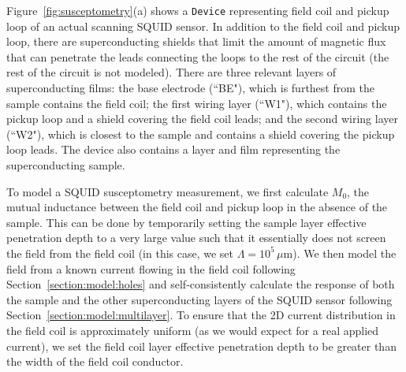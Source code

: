 \documentclass[final,3p,times]{elsarticle}
\newcommand{\inline}[1]{\texttt{#1}\xspace}
\begin{document}

Figure~\ref{fig:susceptometry}(a) shows a \inline{Device} representing field coil and pickup loop of an actual scanning SQUID sensor. In addition to the field coil and pickup loop, there are superconducting shields that limit the amount of magnetic flux that can penetrate the leads connecting the loops to the rest of the circuit (the rest of the circuit is not modeled). There are three relevant layers of superconducting films: the base electrode (``BE"), which is furthest from the sample contains the field coil; the first wiring layer (``W1"), which contains the pickup loop and a shield covering the field coil leads; and the second wiring layer (``W2"), which is closest to the sample and contains a shield covering the pickup loop leads. The device also contains a layer and film representing the superconducting sample.

To model a SQUID susceptometry measurement, we first calculate $M_0$, the mutual inductance between the field coil and pickup loop in the absence of the sample. This can be done by temporarily setting the sample layer effective penetration depth to a very large value such that it essentially does not screen the field from the field coil (in this case, we set $\Lambda = 10^5\,\mu\mathrm{m}$). We then model the field from a known current flowing in the field coil following Section~\ref{section:model:holes} and self-consistently calculate the response of both the sample and the other superconducting layers of the SQUID sensor following Section~\ref{section:model:multilayer}. To ensure that the 2D current distribution in the field coil is approximately uniform (as we would expect for a real applied current), we set the field coil layer effective penetration depth to be greater than the width of the field coil conductor.
\end{document}
